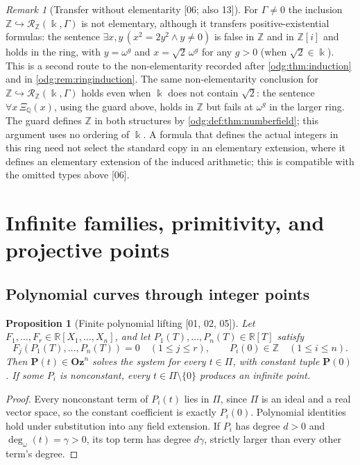 \documentclass[11pt,oneside]{article}
\numberwithin{equation}{section}
\newtheorem{proposition}[proposition]{Proposition}
\theoremstyle{definition}
\theoremstyle{remark}
\newtheorem{remark}[remark]{Remark}
\newcommand{\Oz}{\mathbf{Oz}}
\newcommand{\Z}{\mathbb Z}
\newcommand{\Q}{\mathbb Q}
\newcommand{\R}{\mathbb R}
\newcommand{\ddeg}{\operatorname{deg}_{\omega}}
\newcommand{\src}[1]{\textup{\textsf{\small[#1]}}}
\begin{document}
\begin{remark}[Transfer without elementarity \src{06; also 13}]\label{odg:def:rem:notelementary}
For $\Gamma\ne0$ the inclusion $\Z\hookrightarrow\mathcal R_\Z(\Bbbk,\Gamma)$ is
not elementary, although it transfers positive-existential formulas: the
sentence $\exists x,y\,(x^2=2y^2\wedge y\ne0)$ is false in $\Z$ and in $\Z[i]$
and holds in the ring, with $y=\omega^g$ and $x=\sqrt2\,\omega^g$ for any
$g>0$ (when $\sqrt2\in\Bbbk$). This is a second route to the non-elementarity
recorded after \cref{odg:thm:induction} and in \cref{odg:rem:ringinduction}.
The same non-elementarity conclusion for
$\Z\hookrightarrow\mathcal R_\Z(\Bbbk,\Gamma)$ holds even when $\Bbbk$
does not contain $\sqrt2$: the sentence $\forall x\,\Xi_\Q(x)$, using the
guard above, holds in $\Z$ but fails at $\omega^g$ in the larger ring.
The guard defines $\Z$ in both structures by
\cref{odg:def:thm:numberfield}; this argument uses no ordering of $\Bbbk$.
A formula that defines the actual integers in this ring need not select the
standard copy in an elementary extension, where it defines an elementary
extension of the induced arithmetic; this is compatible with the omitted
types above \src{06}.
\end{remark}

\section{Infinite families, primitivity, and projective points}\label{odg:sec:primitive}

\subsection{Polynomial curves through integer points}

\begin{proposition}[Finite polynomial lifting \src{01, 02, 05}]\label{odg:prop:polylift}
Let $F_1,\ldots,F_r\in\R[X_1,\ldots,X_n]$, and let
$P_1(T),\ldots,P_n(T)\in\R[T]$ satisfy
\[
 F_j(P_1(T),\ldots,P_n(T))=0\quad(1\leq j\leq r),
 \qquad P_i(0)\in\Z\quad(1\leq i\leq n).
\]
Then $\mathbf P(t)\in\Oz^n$ solves the system for every $t\in\Pi$, with
constant tuple $\mathbf P(0)$. If some $P_i$ is nonconstant, every
$t\in\Pi\setminus\{0\}$ produces an infinite point.
\end{proposition}
\begin{proof}
Every nonconstant term of $P_i(t)$ lies in $\Pi$, since $\Pi$ is an ideal and
a real vector space, so the constant coefficient is exactly $P_i(0)$.
Polynomial identities hold under substitution into any field extension. If
$P_i$ has degree $d>0$ and $\ddeg(t)=\gamma>0$, its top term has degree
$d\gamma$, strictly larger than every other term's degree.
\end{proof}
\end{document}
